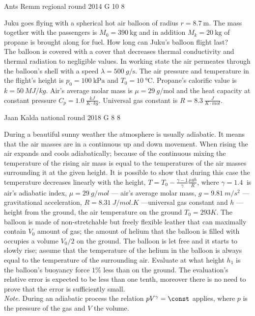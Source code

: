 \documentclass[11pt]{article}
\begin{document}
{Ants Remm} %
{regional round} %
{2014} %
{G 10} %
{8} %
{

\ifEngStatement
Juku goes flying with a spherical hot air balloon of radius $r = \SI{8.7}{\metre}$. The mass together with the passengers is $M_0= \SI{390}{\kg}$ and in addition $M_k = \SI{20}{\kg}$ of propane is brought along for fuel. How long can Juku's balloon flight last?\\ 
The balloon is covered with a cover that decreases thermal conductivity and thermal radiation to negligible values. In working state the air permeates through the balloon's shell with a speed $\lambda = \SI{500}{g\per\s}$. The air pressure and temperature in the flight's height is $p_0 = \SI{100}{\kilo\Pa}$ and $T_0 = \SI{10}{\celsius}$. Propane's calorific value is $k = \SI{50}{MJ/kg}$. Air's average molar mass is $\mu = \SI{29}{g\per\mole}$ and the heat capacity at constant pressure $C_p = \SI{1.0}{\frac{kJ}{K\cdot kg}}$. Universal gas constant is $R = \SI{8.3}{\frac{J}{K\cdot mol}}$.
\fi
}

{Jaan Kalda} %
{national round} %
{2018} %
{G 8} %
{8} %
{

\ifEngStatement
During a beautiful sunny weather the atmosphere is usually adiabatic. It means that the air masses are in a continuous up and down movement. When rising the air expands and cools adiabatically; because of the continuous mixing the temperature of the rising air mass is equal to the temperatures of the air masses surrounding it at the given height. It is possible to show that during this case the temperature decreases linearly with the height, $T=T_0-\frac{\gamma-1}\gamma\frac{\mu g h}R$, where $\gamma=\SI{1.4}{	}$ is air's adiabatic index, $\mu=\SI{29}{g/mol}$ — air's average molar mass, $g=\SI{9.81}{m/s^2}$ — gravitational acceleration, $R=\SI{8.31}{J/mol.K}$ —universal gas constant and $h$ — height from the ground, the air temperature on the ground $T_0=\SI{293}K$. The balloon is made of non-stretchable but freely flexible leather that can maximally contain $V_0$ amount of gas; the amount of helium that the balloon is filled with occupies a volume $V_0/2$ on the ground. The balloon is let free and it starts to slowly rise; assume that the temperature of the helium in the balloon is always equal to the temperature of the surrounding air. Evaluate at what height $h_1$ is the balloon's buoyancy force $1\%$ less than on the ground. The evaluation's relative error is expected to be less than one tenth, moreover there is no need to prove that the error is sufficiently small.\\
\emph{Note.}  During an adiabatic process the relation $pV^\gamma = \const$ applies, where $p$ is the pressure of the gas and $V$ the volume.
\fi
}
\newpage\subsection{\protect{}}
\end{document}

